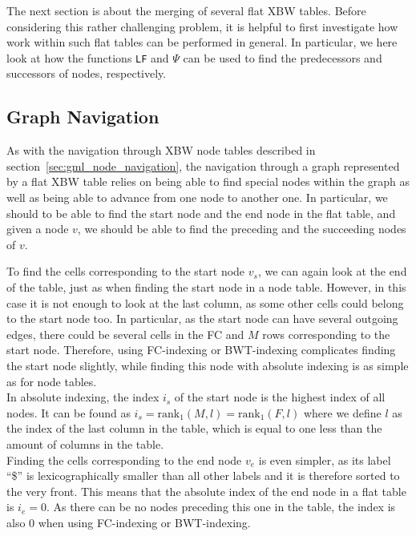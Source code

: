 \documentclass[a4paper,12pt,twoside,BCOR=10mm]{scrbook}
\begin{document}
The next section is about the merging of several flat XBW tables.
Before considering this rather challenging problem,
it is helpful to first investigate how work within such flat tables can be performed in general.
In particular, we here look at how
the functions \texttt{LF} and $ \Psi $ can be used to find the predecessors and successors
of nodes, respectively.

\subsection{Graph Navigation}

As with the navigation through XBW node tables described in section~\ref{sec:gml_node_navigation},
the navigation through a graph represented by a flat XBW table relies on
being able to find special nodes within the graph
as well as being able to advance from one node to another one.
In particular, we should to be able to find the start node and the end node in the flat table,
and given a node $ v $, we should be able to find the preceding and the succeeding nodes of $ v $.

To find the cells corresponding to the start node $ v_s $, we can again look at the end of the table,
just as when finding the start node in a node table.
However, in this case it is not enough to look at the last column, as some other cells could belong
to the start node too. In particular, as the start node can have several outgoing edges,
there could be several cells in the FC and $ M $ rows corresponding to the start node.
Therefore, using FC-indexing or BWT-indexing complicates finding the start node slightly,
while finding this node with absolute indexing is as simple as for node tables. \\
In absolute indexing, the index $ i_s $ of the start node is the highest index of all nodes.
It can be found as $ i_s = \textrm{rank}_1 ( M, l ) = \textrm{rank}_1 ( F, l ) $ where we
define $ l $ as the index of the last column in the table,
which is equal to one less than the amount of columns in the table. \\
Finding the cells corresponding to the end node $ v_e $ is even simpler, as its label “\$” is
lexicographically smaller than all other labels and it is therefore sorted to the very front.
This means that the absolute index of the end node in a flat table is $ i_e = 0 $.
As there can be no nodes preceding this one in the table, the index is also 0 when using
FC-indexing or BWT-indexing.
\end{document}
